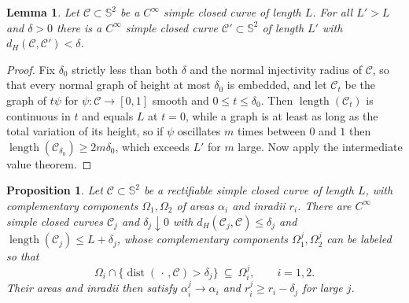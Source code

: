 \documentclass[11pt,oneside,reqno]{amsart}
\theoremstyle{plain}
\newtheorem{proposition}[theorem]{Proposition}
\newtheorem{lemma}[theorem]{Lemma}
\theoremstyle{definition}
\DeclareMathOperator{\dist}{dist}
\DeclareMathOperator{\length}{length}
\newcommand{\Sph}{\mathbb{S}^{2}}
\begin{document}
\begin{lemma}\label{lem:wiggle}
Let $\mathcal{C}\subset\Sph$ be a $C^{\infty}$ simple closed curve of length $L$.
For all $L'>L$ and $\delta>0$ there is a $C^{\infty}$ simple closed curve
$\mathcal{C}'\subset\Sph$ of length $L'$ with
$d_{H}(\mathcal{C},\mathcal{C}')<\delta$.
\end{lemma}

\begin{proof}
Fix $\delta_{0}$ strictly less than both $\delta$ and the normal injectivity
radius of $\mathcal{C}$, so that every normal graph of height at most
$\delta_{0}$ is embedded, and let $\mathcal{C}_{t}$ be the graph of $t\psi$ for
$\psi\colon\mathcal{C}\to[0,1]$ smooth and $0\le t\le\delta_{0}$. Then
$\length(\mathcal{C}_{t})$ is continuous in $t$ and equals $L$ at $t=0$, while a
graph is at least as long as the total variation of its height, so if $\psi$
oscillates $m$ times between $0$ and $1$ then
$\length(\mathcal{C}_{\delta_{0}})\ge2m\delta_{0}$, which exceeds $L'$ for $m$
large. Now apply the intermediate value theorem.
\end{proof}

\begin{proposition}\label{prop:approx}
Let $\mathcal{C}\subset\Sph$ be a rectifiable simple closed curve of length $L$,
with complementary components $\Omega_{1},\Omega_{2}$ of areas $\alpha_{i}$ and
inradii $r_{i}$. There are $C^{\infty}$ simple closed curves $\mathcal{C}_{j}$
and $\delta_{j}\downarrow0$ with $d_{H}(\mathcal{C}_{j},\mathcal{C})\le\delta_{j}$
and $\length(\mathcal{C}_{j})\le L+\delta_{j}$, whose complementary components
$\Omega_{1}^{j},\Omega_{2}^{j}$ can be labeled so that
\begin{equation}\label{eq:sides}
  \Omega_{i}\cap\{\dist(\,\cdot\,,\mathcal{C})>\delta_{j}\}\ \subseteq\ \Omega_{i}^{j},
  \qquad i=1,2 .
\end{equation}
Their areas and inradii then satisfy $\alpha_{i}^{j}\to\alpha_{i}$ and
$r_{i}^{j}\ge r_{i}-\delta_{j}$ for large $j$.
\end{proposition}
\end{document}

